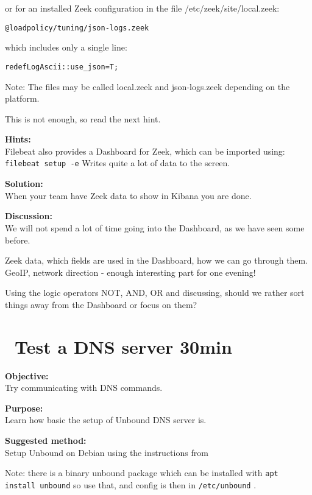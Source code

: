 \documentclass[a4paper,11pt,notitlepage]{report}
\begin{document}
or for an installed Zeek configuration in the file /etc/zeek/site/local.zeek:
\begin{alltt}
@load policy/tuning/json-logs.zeek
\end{alltt}

which includes only a single line:
\begin{alltt}
redef LogAscii::use_json=T;
\end{alltt}

Note: The files may be called local.zeek and json-logs.zeek depending on the platform.

This is not enough, so read the next hint.

{\bf Hints:}\\
Filebeat also provides a Dashboard for Zeek, which can be imported using:\\
\verb+filebeat setup -e+
Writes quite a lot of data to the screen.


{\bf Solution:}\\
When your team have Zeek data to show in Kibana you are done.

{\bf Discussion:}\\
We will not spend a lot of time going into the Dashboard, as we have seen some before.

Zeek data, which fields are used in the Dashboard, how we can go through them. GeoIP, network direction - enough interesting part for one evening!

Using the logic operators NOT, AND, OR and discussing, should we rather sort things away from the Dashboard or focus on them?



\chapter{\faExclamationTriangle\ Test a DNS server 30min}
\label{ex:dns-server-test}

{\bf Objective:}\\
Try communicating with DNS commands.

{\bf Purpose:}\\
Learn how basic the setup of Unbound DNS server is.

{\bf Suggested method:}\\
Setup Unbound on Debian using the instructions from\\

Note: there is a binary unbound package which can be installed with \verb+apt install unbound+ so use that, and config is then in \verb+/etc/unbound+ .
\end{document}
